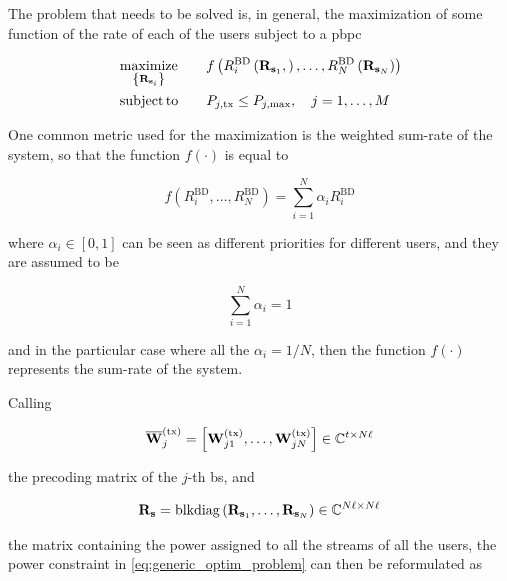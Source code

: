 The problem that needs to be solved is, in general, the maximization of some
function of the rate of each of the users subject to a \gls{pbpc}

\begin{equation} \label{eq:generic_optim_problem}
\begin{aligned}
	&\operatorname*{maximize}\limits_{\left\{\mathbf{R}_{\mathbf{s}_i}\right\}} &&\quad f\left(R_i^{\text{BD}}
    \left(\mathbf{R}_{\mathbf{s}_1},\right), \ldots, R_N^{\text{BD}}\left(\mathbf{R}_{\mathbf{s}_N}\right)
    \right) \\
	&\operatorname*{subject\,to} &&\quad P_{j, \text{tx}} \leq P_{j, \max},\quad j = 1, \ldots, M
\end{aligned}
\end{equation}

One common metric used for the maximization is the weighted sum-rate of the
system, so that the function $f\left(\cdot\right)$ is equal to

\begin{equation} \label{eq:weighted_sum_rate}
    f\left(R_i^{\text{BD}}, \ldots, R_N^{\text{BD}}\right) =
    \sum\limits_{i = 1}^{N}\alpha_i R_i^{\text{BD}}
\end{equation}

\noindent
where $\alpha_i \in \left[0, 1\right]$ can be seen as different priorities for
different users, and they are assumed to be

\begin{equation} \label{eq:priorities}
    \sum\limits_{i = 1}^{N}\alpha_i = 1
\end{equation}

\noindent
and in the particular case where all the $\alpha_i = 1/N$, then the function
$f\left(\cdot\right)$ represents the sum-rate of the system.

Calling

\begin{equation} \label{eq:precoding_bs}
	\mathbf{\overline{W}}^{(\text{tx})}_j = \left[\mathbf{W}^{(\text{tx})}_{j1}, \ldots, \mathbf{W}^{(\text{tx})}_{jN}\right] \in \mathbb{C}^{t \times
	N\ell}
\end{equation}

\noindent
the precoding matrix of the $j$-th \gls{bs}, and

\begin{equation} \label{eq:powers_all_users}
	\mathbf{R}_{\mathbf{s}} = \operatorname*{blkdiag} \left(\mathbf{R}_{\mathbf{s}_1}, \ldots, \mathbf{R}_{\mathbf{s}_N}\right) \in
	\mathbb{C}^{N\ell \times N\ell}
\end{equation}

\noindent
the matrix containing the power assigned to all the streams of all the users,
the power constraint in \eqref{eq:generic_optim_problem} can then be
reformulated as

